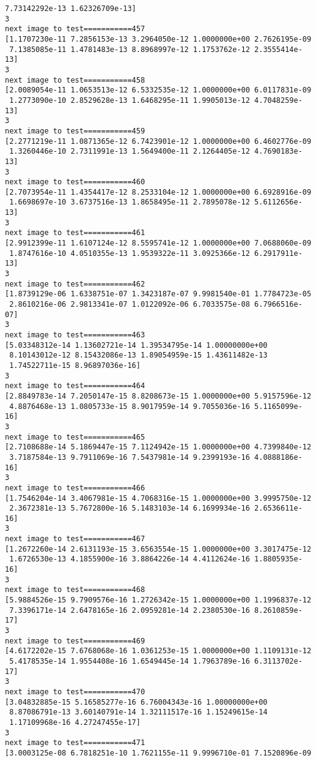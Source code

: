 \documentclass[11pt]{article}
\begin{document}
\begin{Verbatim}[commandchars=\\\{\}]
 7.73142292e-13 1.62326709e-13]
3
next image to test===========457
[1.1707230e-11 7.2856153e-13 3.2964050e-12 1.0000000e+00 2.7626195e-09
 7.1385085e-11 1.4781483e-13 8.8968997e-12 1.1753762e-12 2.3555414e-13]
3
next image to test===========458
[2.0089054e-11 1.0653513e-12 6.5332535e-12 1.0000000e+00 6.0117831e-09
 1.2773090e-10 2.8529628e-13 1.6468295e-11 1.9905013e-12 4.7048259e-13]
3
next image to test===========459
[2.2771219e-11 1.0871365e-12 6.7423901e-12 1.0000000e+00 6.4602776e-09
 1.3260446e-10 2.7311991e-13 1.5649400e-11 2.1264405e-12 4.7690183e-13]
3
next image to test===========460
[2.7073954e-11 1.4354417e-12 8.2533104e-12 1.0000000e+00 6.6928916e-09
 1.6698697e-10 3.6737516e-13 1.8658495e-11 2.7895078e-12 5.6112656e-13]
3
next image to test===========461
[2.9912399e-11 1.6107124e-12 8.5595741e-12 1.0000000e+00 7.0688060e-09
 1.8747616e-10 4.0510355e-13 1.9539322e-11 3.0925366e-12 6.2917911e-13]
3
next image to test===========462
[1.8739129e-06 1.6338751e-07 1.3423187e-07 9.9981540e-01 1.7784723e-05
 2.8610216e-06 2.9813341e-07 1.0122092e-06 6.7033575e-08 6.7966516e-07]
3
next image to test===========463
[5.03348312e-14 1.13602721e-14 1.39534795e-14 1.00000000e+00
 8.10143012e-12 8.15432086e-13 1.89054959e-15 1.43611482e-13
 1.74522711e-15 8.96897036e-16]
3
next image to test===========464
[2.8849783e-14 7.2050147e-15 8.8208673e-15 1.0000000e+00 5.9157596e-12
 4.8876468e-13 1.0805733e-15 8.9017959e-14 9.7055036e-16 5.1165099e-16]
3
next image to test===========465
[2.7108688e-14 5.1869447e-15 7.1124942e-15 1.0000000e+00 4.7399840e-12
 3.7187584e-13 9.7911069e-16 7.5437981e-14 9.2399193e-16 4.0888186e-16]
3
next image to test===========466
[1.7546204e-14 3.4067981e-15 4.7068316e-15 1.0000000e+00 3.9995750e-12
 2.3672381e-13 5.7672800e-16 5.1483103e-14 6.1699934e-16 2.6536611e-16]
3
next image to test===========467
[1.2672260e-14 2.6131193e-15 3.6563554e-15 1.0000000e+00 3.3017475e-12
 1.6726530e-13 4.1855900e-16 3.8864226e-14 4.4112624e-16 1.8805935e-16]
3
next image to test===========468
[5.9884526e-15 9.7909576e-16 1.2726342e-15 1.0000000e+00 1.1996837e-12
 7.3396171e-14 2.6478165e-16 2.0959281e-14 2.2380530e-16 8.2610859e-17]
3
next image to test===========469
[4.6172202e-15 7.6768068e-16 1.0361253e-15 1.0000000e+00 1.1109131e-12
 5.4178535e-14 1.9554408e-16 1.6549445e-14 1.7963789e-16 6.3113702e-17]
3
next image to test===========470
[3.04832885e-15 5.16585277e-16 6.76004343e-16 1.00000000e+00
 8.87086791e-13 3.60140791e-14 1.32111517e-16 1.15249615e-14
 1.17109968e-16 4.27247455e-17]
3
next image to test===========471
[3.0003125e-08 6.7818251e-10 1.7621155e-11 9.9996710e-01 7.1520896e-09

\end{Verbatim}
\end{document}
